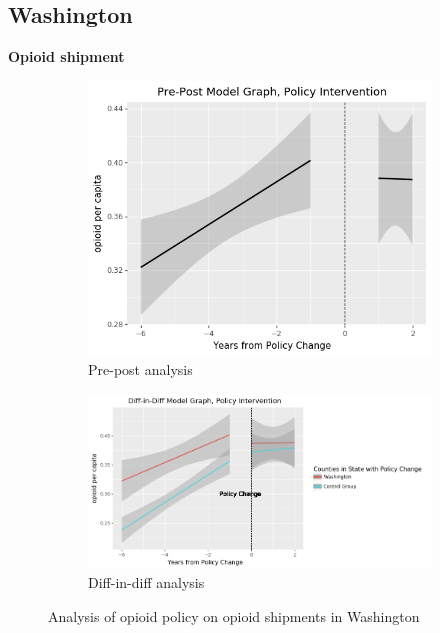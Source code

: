 \documentclass[12pt,letterpaper]{article}
\begin{document}
\subsection{Washington}
\textbf{Opioid shipment}

\begin{figure}[!h]
\centering
\begin{subfigure}{.5\textwidth}
  \centering
  \includegraphics[width=0.7\linewidth]{../30_results/General_Results/washington_opioid_shipment_prepost.png}
  \caption{Pre-post analysis}
  \label{fig:wa_ship_prepost}
\end{subfigure}%
\begin{subfigure}{.55\textwidth}
  \centering
  \includegraphics[width=1\linewidth]{../30_results/General_Results/washington_opioid_shipment_diffdiff.png}
  \caption{Diff-in-diff analysis}
  \label{fig:wa_ship_did}
\end{subfigure}
\caption{Analysis of opioid policy on opioid shipments in Washington}
\label{fig:wa_ship}
\end{figure}
\end{document}
